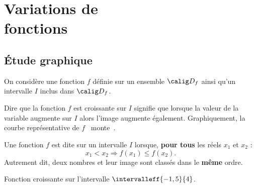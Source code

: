 \documentclass[10pt,openright,twoside,french]{book}
\begin{document}
\renewcommand\PartProgramme{Fonctions}
\chapter[Variations de fonctions]{Variations de \\ fonctions}\label{ch_variations_fonctions}

\section{\'Etude graphique}

On considère une fonction $f$ définie sur un ensemble $\calig D_f$ ainsi qu'un intervalle $I$ inclus dans $\calig D_f$.\par\medskip

Dire que la fonction $f$ est croissante sur $I$ signifie que lorsque la valeur de la variable augmente sur $I$ alors l'image augmente également. Graphiquement, la courbe représentative de $f$ \og~monte~\fg.

\begin{Defi}
    Une fonction $f$ est dite  sur un intervalle $I$ lorsque, \textbf{pour tous} les réels $x_1$ et $x_2$ :
    \[x_1 < x_2 \Rightarrow f(x_1) \leq f(x_2).\]
    Autrement dit, deux nombres et leur image sont classés dans le \textbf{même} ordre.
\end{Defi}

\begin{Exemple}
Fonction croissante sur l'intervalle $\intervalleff{-1,5}{4}$.
\end{Exemple}
\end{document}
